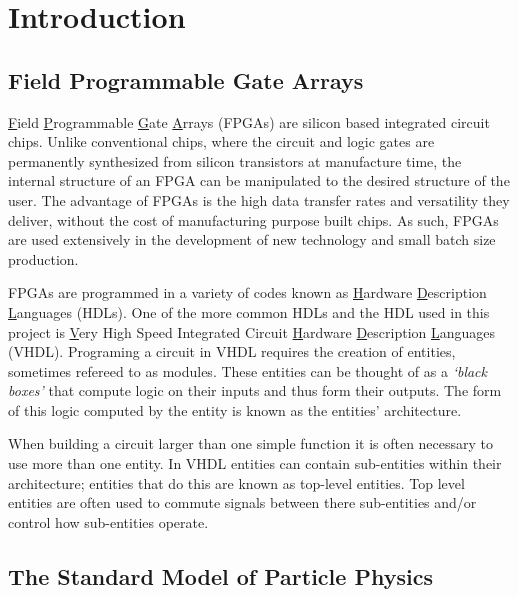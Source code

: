 \section{Introduction}

  \subsection{Field Programmable Gate Arrays}

    \underline{F}ield \underline{P}rogrammable \underline{G}ate \underline{A}rrays (FPGAs) are silicon based integrated circuit chips.
    Unlike conventional chips, where the circuit and logic gates are permanently synthesized from silicon transistors at manufacture time, the internal structure of an FPGA can be manipulated to the desired structure of the user.
    The advantage of FPGAs is the high data transfer rates and versatility they deliver, without the cost of manufacturing purpose built chips. 
    As such, FPGAs are used extensively in the development of new technology and small batch size production. \cite{fpga}
    \par
    FPGAs are programmed in a variety of codes known as \underline{H}ardware \underline{D}escription \underline{L}anguages (HDLs).
    One of the more common HDLs and the HDL used in this project is \underline{V}ery High Speed Integrated Circuit \underline{H}ardware \underline{D}escription \underline{L}anguages (VHDL).
    Programing a circuit in VHDL requires the creation of entities, sometimes refereed to as modules.
    These entities can be thought of as a \textit{`black boxes'} that compute logic on their inputs and thus form their outputs.
    The form of this logic computed by the entity is known as the entities' architecture.
    \par
    When building a circuit larger than one simple function it is often necessary to use more than one entity.
    In VHDL entities can contain sub-entities within their architecture; entities that do this are known as top-level entities.
    Top level entities are often used to commute signals between there sub-entities and/or control how sub-entities operate.

	\subsection{The Standard Model of Particle Physics}

